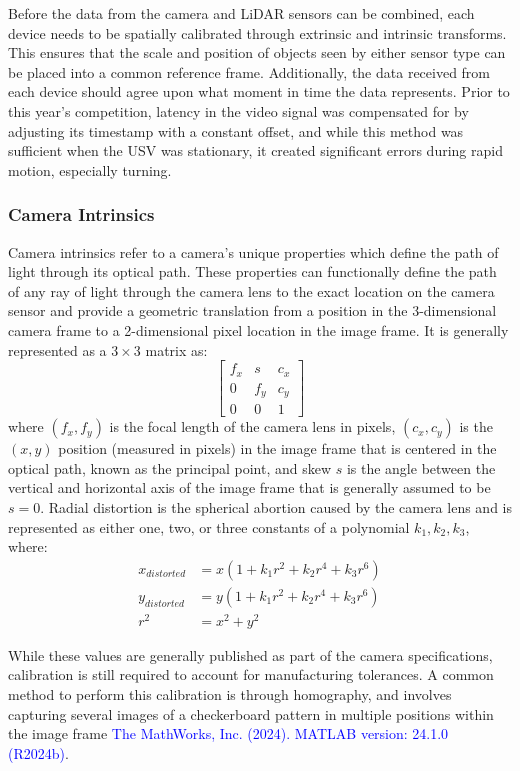 \documentclass{erauthesis}
\begin{document}
Before the data from the camera and LiDAR sensors can be combined, each device needs to be spatially calibrated through extrinsic and intrinsic transforms. 
This ensures that the scale and position of objects seen by either sensor type can be placed into a common reference frame. 
Additionally, the data received from each device should agree upon what moment in time the data represents. 
Prior to this year's competition, latency in the video signal was compensated for by adjusting its timestamp with a constant offset, and while this method was sufficient when the USV was stationary, it created significant errors during rapid motion, especially turning.

\subsubsection{Camera Intrinsics}

Camera intrinsics refer to a camera's unique properties which define the path of light through its optical path.
These properties can functionally define the path of any ray of light through the camera lens to the exact location on the camera sensor and provide a geometric translation from a position in the 3-dimensional camera frame to a 2-dimensional pixel location in the image frame. 
It is generally represented as a $3 \times 3$ matrix as:
$$
\begin{bmatrix}
    f_x & s & c_x \\
    0 & f_y & c_y \\
    0 & 0 & 1
\end{bmatrix}
$$
where $(f_x, f_y)$ is the focal length of the camera lens in pixels, $(c_x, c_y)$ is the $(x,y)$ position (measured in pixels) in the image frame that is centered in the optical path, known as the principal point, and skew $s$ is the angle between the vertical and horizontal axis of the image frame that is generally assumed to be $s = 0$. 
Radial distortion is the spherical abortion caused by the camera lens and is represented as either one, two, or three constants of a polynomial $k_1,k_2,k_3$, where:
\begin{align*}
x_{distorted} & = x(1+k_1r^2+k_2r^4+k_3r^6)\\
y_{distorted} & = y(1+k_1r^2+k_2r^4+k_3r^6)\\
r^2 & = x^2+y^2
\end{align*}

While these values are generally published as part of the camera specifications, calibration is still required to account for manufacturing tolerances. A common method to perform this calibration is through homography, and involves capturing several images of a checkerboard pattern in multiple positions within the image frame \textcolor{blue}{The MathWorks, Inc. (2024). MATLAB version: 24.1.0 (R2024b)}.
\end{document}
